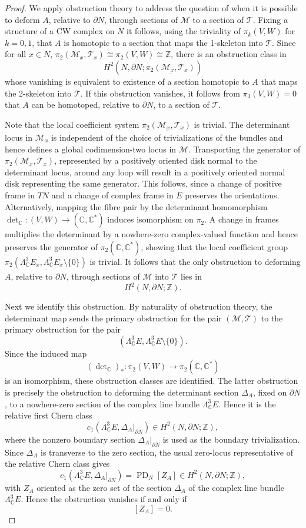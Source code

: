 \documentclass[12pt]{amsart}
\theoremstyle{definition}
\newcommand{\C}{\mathbb{C}}
\newcommand{\Z}{\mathbb{Z}}
\newcommand{\PD}{\operatorname{PD}}
\newcommand{\cM}{\mathcal{M}}
\newcommand{\cT}{\mathcal{T}}
\numberwithin{equation}{section}
\begin{document}
\begin{proof}
We apply obstruction theory to address the question of when it is possible to deform $A$, relative to $\partial N$, through sections of $\cM$ to a section of $\cT$. Fixing a structure of a CW complex on $N$ it follows, using the triviality of $\pi_k(V,W)$ for $k=0, 1$, that $A$ is homotopic to a section that maps the 1-skeleton into $\cT$. Since for all $x\in N$, $\pi_2(\cM_x,\cT_x) \cong \pi_2(V,W) \cong \Z$, there is an obstruction class in 
\[H^2\left(N,\partial N;\underline{\pi_2(\cM_x,\cT_x)}\right)\]
whose vanishing is equivalent to existence of a section homotopic to $A$ that maps the 2-skeleton into $\cT$. If this obstruction vanishes, it follows from $\pi_3(V,W) = 0$ that $A$ can be homotoped, relative to $\partial N$, to a section of $\cT$.

Note that the local coefficient system $\underline{\pi_2(\cM_x,\cT_x)}$ is trivial. The determinant locus in $\cM_x$ is independent of the choice of trivializations of the bundles and hence defines a global codimension-two locus in $\cM$. Transporting the generator of $\pi_2(\cM_x,\cT_x)$, represented by a positively oriented disk normal to the determinant locus, around any loop will result in a positively oriented normal disk representing the same generator. This follows, since a change of positive frame in $TN$ and a change of complex frame in $E$ preserves the orientations. Alternatively, mapping the fibre pair by the determinant homomorphism $\det_{\C} : (V,W) \to (\C,\C^*)$ induces isomorphism on $\pi_2$. A change in frames multiplies the determinant by a nowhere-zero complex-valued function and hence preserves the generator of $\pi_2(\C,\C^*)$, showing that the local coefficient group $\underline{\pi_2\left(\Lambda^3_{\C}E_x,\Lambda^3_{\C}E_x\setminus\{0\}\right)}$ is trivial. It follows that the only obstruction to deforming $A$, relative to $\partial N$, through sections of $\cM$ into $\cT$ lies in
\[H^2(N,\partial N;\Z).\]

Next we identify this obstruction. By naturality of obstruction theory, the determinant map sends the primary obstruction for the pair $(\cM,\cT)$ to the primary obstruction for the pair
\[\left(\Lambda^3_{\C}E,\Lambda^3_{\C}E\setminus\{0\}\right).\]
Since the induced map
\[(\det\nolimits_\C)_*:\pi_2(V,W)\longrightarrow \pi_2(\mathbb C,\mathbb C^*)\]
is an isomorphism, these obstruction classes are identified. The latter obstruction is precisely the obstruction to deforming the determinant section $\Delta_A$, fixed on $\partial N$, to a nowhere-zero section of the complex line bundle $\Lambda^3_{\mathbb C}E$. Hence it is the relative first Chern class
\[c_1\left(\Lambda^3_{\mathbb C}E,\Delta_A|_{\partial N}\right)\in H^2(N,\partial N;\mathbb Z),\]
where the nonzero boundary section \(\Delta_A|_{\partial N}\) is used as the boundary trivialization. Since $\Delta_A$ is transverse to the zero section, the usual zero-locus representative of the relative Chern class gives
\[c_1\left(\Lambda^3_{\C}E,\Delta_A|_{\partial N}\right) =\PD_N[Z_A]\in H^2(N,\partial N;\Z),\]
with $Z_A$ oriented as the zero set of the section $\Delta_A$ of the complex line bundle $\Lambda^3_{\C}E$. Hence the obstruction vanishes if and only if
\[ [Z_A]=0.\]


\end{proof}
\end{document}
